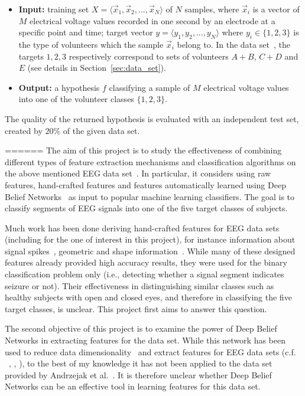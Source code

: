 \documentclass[12pt]{article}
\newcommand{\myvec}[1]{\vec{#1}}
\begin{document}
\begin{itemize}
\item \textbf{Input:} training set $X = \langle \myvec{x}_1, \myvec{x}_2, ..., \myvec{x}_N\rangle$ of $N$ samples, where $\myvec{x}_i$ is a vector of $M$ electrical voltage values recorded in one second by an electrode at a specific point and time; target vector $y = \langle y_1, y_2, ..., y_N \rangle$ where $y_i \in \{1, 2, 3\}$ is the type of volunteers which the sample $\myvec{x}_i$ belong to. In the data set~\cite{andrzejak2001indications}, the targets $1, 2, 3$ respectively correspond to sets of volunteers $A + B$, $C + D$ and $E$ (see details in Section~\ref{sec:data_set}).
\item \textbf{Output:} a hypothesis $f$ classifying a sample of $M$ electrical voltage values into one of the volunteer classes $\{1, 2, 3\}$.
\end{itemize}

The quality of the returned hypothesis is evaluated with an independent test set, created by $20\%$ of the given data set. 

======
The aim of this project is to study the effectiveness of combining different types of feature extraction mechanisms and classification algorithms on the above mentioned EEG data set~\cite{andrzejak2001indications}. In particular, it considers using raw features, hand-crafted features and features automatically learned using Deep Belief Networks~\cite{hinton2006reducing} as input to popular machine learning classifiers. The goal is to classify segments of EEG signals into one of the five target classes of subjects.

Much work has been done deriving hand-crafted features for EEG data sets (including for the one of interest in this project), for instance information about signal spikes~\cite{nigam2004neural}, geometric and shape information~\cite{wulsin2011modeling}. While many of these designed features already provided high accuracy results, they were used for the binary classification problem only (i.e., detecting whether a signal segment indicates seizure or not). Their effectiveness in distinguishing similar classes such as healthy subjects with open and closed eyes, and therefore in classifying the five target classes, is unclear. This project first aims to answer this question.

The second objective of this project is to examine the power of Deep Belief Networks in extracting features for the data set. While this network has been used to reduce data dimensionality~\cite{hinton2006reducing} and extract features for EEG data sets (c.f. ~\cite{langkvist2012sleep}, \cite{wang2013modeling}, \cite{wulsin2011modeling}), to the best of my knowledge it has not been applied to the data set provided by Andrzejak et al.~\cite{andrzejak2001indications}. It is therefore unclear whether Deep Belief Networks can be an effective tool in learning features for this data set.
\end{document}
